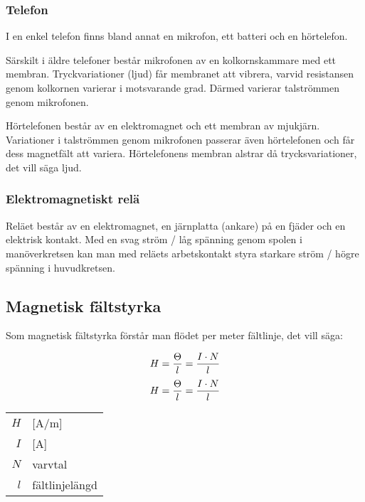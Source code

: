 \subsubsection{Telefon}
I en enkel telefon finns bland annat en mikrofon, ett batteri och en
hörtelefon.

Särskilt i äldre telefoner består mikrofonen av en kolkornskammare med ett
membran.
Tryckvariationer (ljud) får membranet att vibrera, varvid resistansen genom
kolkornen varierar i motsvarande grad.
Därmed varierar talströmmen genom mikrofonen.

Hörtelefonen består av en elektromagnet och ett membran av mjukjärn.
Variationer i talströmmen genom mikrofonen passerar även hörtelefonen och får
dess magnetfält att variera.
Hörtelefonens membran alstrar då trycksvariationer, det vill säga ljud.

\subsubsection{Elektromagnetiskt relä}
Reläet består av en elektromagnet, en järnplatta (ankare) på en fjäder och en
elektrisk kontakt.
Med en svag ström / låg spänning genom spolen i manöverkretsen kan man med
reläets arbetskontakt styra starkare ström / högre spänning i huvudkretsen.

\subsection{Magnetisk fältstyrka}
\label{magnetisk_fältstyrka}

Som magnetisk fältstyrka förstår man flödet per meter fältlinje, det vill säga:

\begin{equation*}
  H = \frac{\Theta}{l} = \frac{I \cdot N}{l} \\
\end{equation*}
%
\begin{equation*}
  H = \frac{\Theta}{l} = \frac{I \cdot N}{l} \\
\end{equation*}

\begin{table}[H]
	\centering
	\begin{tabular}{rl}
	$H$ & [A/m]\\
	$I$ & [A]\\
	$N$ & varvtal\\
	$l$ & fältlinjelängd\\
\end{tabular}
\end{table}


